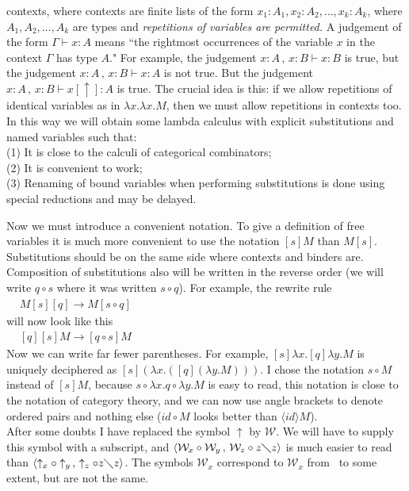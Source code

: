 \documentclass[11pt]{amsart}
\theoremstyle{plain}
\theoremstyle{definition}
\theoremstyle{remark}
\numberwithin{equation}{section}
\newcommand{\ci}{\circ}
\newcommand{\mi}{\,,\,}
\newcommand{\is}{\diagdown}
\newcommand{\arrow}{\rightarrow}
\newcommand{\la}{\langle}
\newcommand{\ra}{\rangle}
\renewcommand{\pi}{\mathcal{W}}
\begin{document}
contexts, where  contexts are finite lists of the form $x_1:A_1,
x_2:A_2,\ldots, x_k:A_k$, where $A_1,A_2,\ldots,A_k$ are types and
\emph{repetitions of variables are permitted.}  A judgement of the
form $\Gamma\vdash x:A$ means ``the rightmost occurrences of the
variable $x$ in the context $\Gamma$ has type $A$." For example,
the judgement $x:A\mi x:B\vdash x:B$ is true, but the judgement
$x:A\mi x:B\vdash x:A$ is not true. But the judgement $x:A\mi
x:B\vdash x[\uparrow]:A$ is true.  The crucial idea is this: if we
allow repetitions of identical variables as in $\lambda x.\lambda
x.M$, then we must allow repetitions in contexts too. In this way
we will obtain some lambda calculus with explicit
substitutions and named variables such that:\\
 (1) It is close to  the calculi of categorical combinators;\\
 (2) It is convenient to work;\\
 (3) Renaming of bound variables when
performing substitutions is done using  special reductions and may
be delayed.

Now we must introduce a convenient notation.  To give a definition
of free variables  it is much more convenient to use the notation
$[s]M$ than   $M[s]$. Substitutions should be on the same side
where contexts and binders are. Composition of substitutions also
will be written in the reverse order (we will write $q\ci s$ where
it was written $s\ci q$). For example, the
rewrite rule\\
$\begin{array}{ll} & M[s][q]\arrow M[s\ci q]
\end{array}$\\[3pt]
will now look like this\\
$\begin{array}{ll} & [q][s]M\arrow[q\ci s]M
\end{array}$\\
Now we can write far fewer parentheses. For example, $[s]\lambda
x.[q]\lambda y.M$ is uniquely deciphered as $[s](\lambda
x.([q](\lambda y.M)))$. I chose the notation $s\ci M$  instead of
$[s]M$, because $s\ci\lambda x.q\ci\lambda y.M$ is easy to read,
this notation is close to the notation of category theory, and we
can now use angle brackets to denote  ordered pairs and nothing
else ($id\circ M$ looks better than $\la id \ra M$).\\ After some
doubts I have replaced the symbol $\uparrow$ by $\pi$. We will
have to supply this symbol with a subscript, and
$\la\pi_x\ci\pi_y\mi\pi_z\ci z\is z\ra$ is much easier to read
than $\la\uparrow_x\ci\uparrow_y\mi\uparrow_z\ci z\is z\ra$. The
symbols $\pi_x$  correspond to $\mathcal{W}_x$ from~\cite{Kesner}
to some extent, but are not the same.
\end{document}
